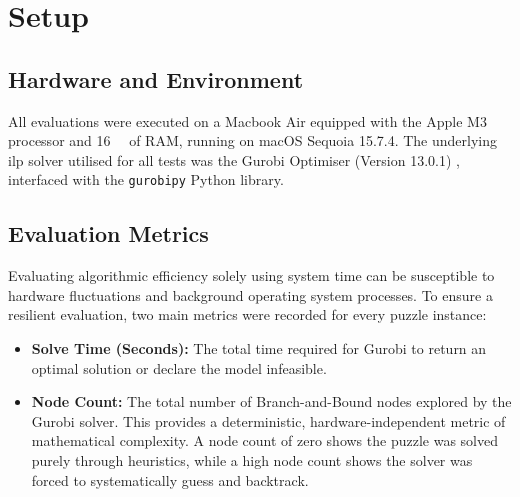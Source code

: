 %


\section{Setup}\label{sec:setup}

\subsection{Hardware and Environment}\label{subsec:hardware-environment}
All evaluations were executed on a Macbook Air equipped with the Apple M3 processor and \SI{16}{\giga\byte} of RAM, running on macOS Sequoia 15.7.4. The underlying \gls{ilp} solver utilised for all tests was the Gurobi Optimiser (Version 13.0.1) \citep{gurobi2024}, interfaced with the \verb|gurobipy| Python library.

\subsection{Evaluation Metrics}\label{subsec:evaluation-metrics}
Evaluating algorithmic efficiency solely using system time can be susceptible to hardware fluctuations and background operating system processes. To ensure a resilient evaluation, two main metrics were recorded for every puzzle instance:
\begin{itemize}
  \item \textbf{Solve Time (Seconds):} The total time required for Gurobi to return an optimal solution or declare the model infeasible.
  \item \textbf{Node Count:} The total number of Branch-and-Bound nodes explored by the Gurobi solver. This provides a deterministic, hardware-independent metric of mathematical complexity. A node count of zero shows the puzzle was solved purely through heuristics, while a high node count shows the solver was forced to systematically guess and backtrack.
\end{itemize}

